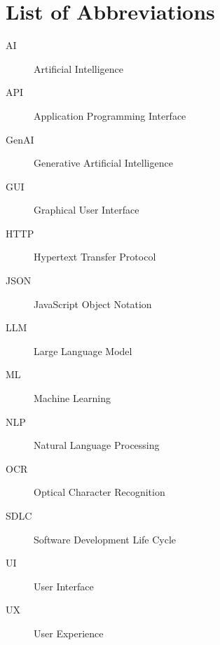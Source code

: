 \chapter*{List of Abbreviations}

\begin{description}
    \item[AI] Artificial Intelligence
    \item[API] Application Programming Interface
    \item[GenAI] Generative Artificial Intelligence
    \item[GUI] Graphical User Interface
    \item[HTTP] Hypertext Transfer Protocol
    \item[JSON] JavaScript Object Notation
    \item[LLM] Large Language Model
    \item[ML] Machine Learning
    \item[NLP] Natural Language Processing
    \item[OCR] Optical Character Recognition
    \item[SDLC] Software Development Life Cycle
    \item[UI] User Interface
    \item[UX] User Experience
\end{description}
